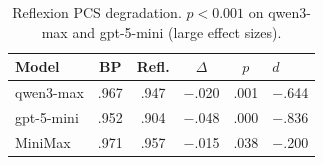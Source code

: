 \begin{table}[t]
\centering
\small
\begin{tabular}{lccccl}
\toprule
\textbf{Model} & \textbf{BP} & \textbf{Refl.} & \textbf{$\Delta$} & \textbf{$p$} & \textbf{$d$} \\
\midrule
qwen3-max & .967 & .947 & $-$.020 & .001 & $-$.644 \\
gpt-5-mini & .952 & .904 & $-$.048 & .000 & $-$.836 \\
MiniMax & .971 & .957 & $-$.015 & .038 & $-$.200 \\
\bottomrule
\end{tabular}
\caption{Reflexion PCS degradation. $p<0.001$ on qwen3-max and gpt-5-mini (large effect sizes).}
\label{tab:reflexion}
\end{table}
